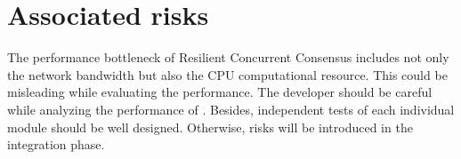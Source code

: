 \section{Associated risks}
The performance bottleneck of Resilient Concurrent Consensus includes not only the 
network bandwidth but also the CPU computational resource. 
This could be misleading while evaluating the performance. 
The developer should be careful while analyzing the performance of \RCC{}.
Besides, independent tests of each individual module should be 
well designed. Otherwise, risks will be introduced in the integration phase.